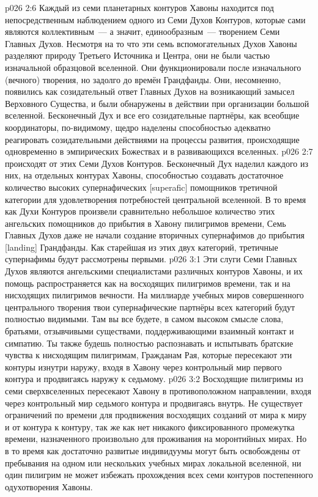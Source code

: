\vs p026 2:6 \pc Каждый из семи планетарных контуров Хавоны находится под непосредственным наблюдением одного из Семи Духов Контуров, которые сами являются коллективным~--- а значит, единообразным~--- творением Семи Главных Духов. Несмотря на то что эти семь вспомогательных Духов Хавоны разделяют природу Третьего Источника и Центра, они не были частью изначальной образцовой вселенной. Они функционировали после изначального (вечного) творения, но задолго до времён Грандфанды. Они, несомненно, появились как созидательный ответ Главных Духов на возникающий замысел Верховного Существа, и были обнаружены в действии при организации большой вселенной. Бесконечный Дух и все его созидательные партнёры, как всеобщие координаторы, по\hyp{}видимому, щедро наделены способностью адекватно реагировать созидательными действиями на процессы развития, происходящие одновременно в эмпирических Божествах и в развивающихся вселенных.
\vs p026 2:7 \pc {} происходят от этих Семи Духов Контуров. Бесконечный Дух наделил каждого из них, на отдельных контурах Хавоны, способностью создавать достаточное количество высоких супернафических [superafic] помощников третичной категории для удовлетворения потребностей центральной вселенной. В то время как Духи Контуров произвели сравнительно небольшое количество этих ангельских помощников до прибытия в Хавону пилигримов времени, Семь Главных Духов даже не начали создание вторичных супернафимов до прибытия [landing] Грандфанды. Как старейшая из этих двух категорий, третичные супернафимы будут рассмотрены первыми.
\vs p026 3:1 Эти слуги Семи Главных Духов являются ангельскими специалистами различных контуров Хавоны, и их помощь распространяется как на восходящих пилигримов времени, так и на нисходящих пилигримов вечности. На миллиарде учебных миров совершенного центрального творения твои супернафические партнёры всех категорий будут полностью видимыми. Там вы все будете, в самом высоком смысле слова, братьями, отзывчивыми существами, поддерживающими взаимный контакт и симпатию. Ты также будешь полностью распознавать и испытывать братские чувства к нисходящим пилигримам, Гражданам Рая, которые пересекают эти контуры изнутри наружу, входя в Хавону через контрольный мир первого контура и продвигаясь наружу к седьмому.
\vs p026 3:2 Восходящие пилигримы из семи сверхвселенных пересекают Хавону в противоположном направлении, входя через контрольный мир седьмого контура и продвигаясь внутрь. Не существует ограничений по времени для продвижения восходящих созданий от мира к миру и от контура к контуру, так же как нет никакого фиксированного промежутка времени, назначенного произвольно для проживания на моронтийных мирах. Но в то время как достаточно развитые индивидуумы могут быть освобождены от пребывания на одном или нескольких учебных мирах локальной вселенной, ни один пилигрим не может избежать прохождения всех семи контуров постепенного одухотворения Хавоны.
